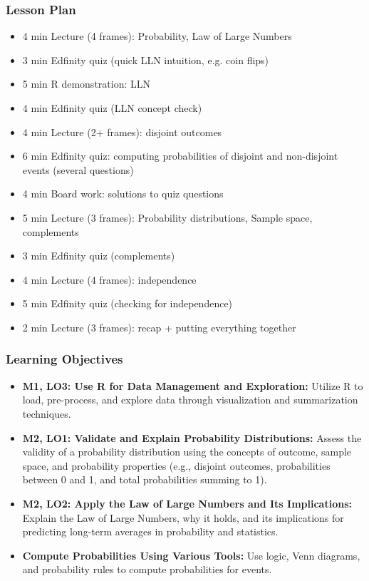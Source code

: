 \begin{frame}
    \frametitle{Lesson Plan}
    \begin{itemize}
        \item 4 min Lecture (4 frames): Probability, Law of Large Numbers
        \item 3 min Edfinity quiz (quick LLN intuition, e.g. coin flips)
        \item 5 min R demonstration: LLN
        \item 4 min Edfinity quiz (LLN concept check)
        \item 4 min Lecture (2+ frames): disjoint outcomes
        \item 6 min Edfinity quiz: computing probabilities of disjoint and non-disjoint events (several questions)
        \item 4 min Board work: solutions to quiz questions
        \item 5 min Lecture (3 frames): Probability distributions, Sample space, complements
        \item 3 min Edfinity quiz (complements)
        \item 4 min Lecture (4 frames): independence
        \item 5 min Edfinity quiz (checking for independence)
        \item 2 min Lecture (3 frames): recap + putting everything together
    \end{itemize}
\end{frame}

\begin{frame}
    \frametitle{Learning Objectives}
    \begin{itemize}
        \item \textbf{M1, LO3: Use R for Data Management and Exploration:} Utilize R to load, pre-process, and explore data through visualization and summarization techniques.
        \item \textbf{M2, LO1: Validate and Explain Probability Distributions:} Assess the validity of a probability distribution using the concepts of outcome, sample space, and probability properties (e.g., disjoint outcomes, probabilities between 0 and 1, and total probabilities summing to 1).
        \item \textbf{M2, LO2: Apply the Law of Large Numbers and Its Implications:} Explain the Law of Large Numbers, why it holds, and its implications for predicting long-term averages in probability and statistics.
        \item \textbf{Compute Probabilities Using Various Tools:} Use logic, Venn diagrams, and probability rules to compute probabilities for events.
    \end{itemize}
\end{frame}

